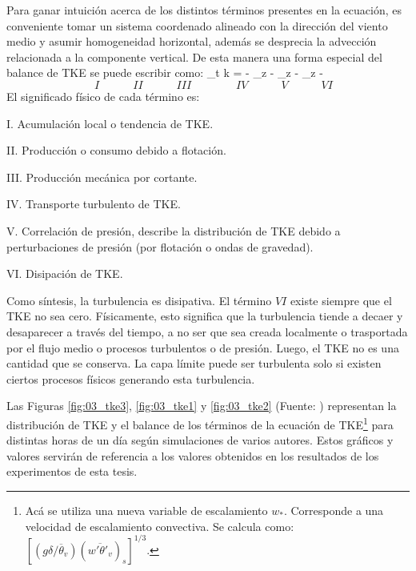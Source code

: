 Para ganar intuición acerca de los distintos términos presentes en la ecuación, es conveniente tomar un sistema coordenado alineado con la dirección del viento medio y asumir homogeneidad horizontal, además se desprecia la advección relacionada a la componente vertical. De esta manera una forma especial del balance de TKE se puede escribir como:
\newpage
\be
\partial_t k  =  -  \partial_z  - \partial_z -  \partial_z  - \varepsilon
\ee
\vspace{-7mm}
\begin{equation*}
\quad I \quad\qquad II\quad\qquad III\qquad\qquad IV\quad\qquad V\quad\qquad VI
\end{equation*}
El significado físico de cada término es:
\begin{enumerate*}
	\item[I.] Acumulación local o tendencia de TKE.
	\item[II.] Producción o consumo debido a flotación.
	\item[III.] Producción mecánica por cortante.
	\item[IV.] Transporte turbulento de TKE.
	\item[V.] Correlación de presión, describe la distribución de TKE debido a perturbaciones de presión (por flotación o ondas de gravedad).
	\item[VI.] Disipación de TKE.
\end{enumerate*}

Como síntesis, la turbulencia es disipativa. El término $VI$ existe siempre que el TKE no sea cero. Físicamente, esto significa que la turbulencia tiende a decaer y desaparecer a través del tiempo, a no ser que sea creada localmente o trasportada por el flujo medio o procesos turbulentos o de presión. Luego, el TKE no es una cantidad que se conserva. La capa límite puede ser turbulenta solo si existen ciertos procesos físicos generando esta turbulencia.

Las Figuras \ref{fig:03_tke3}, \ref{fig:03_tke1} y \ref{fig:03_tke2} (Fuente: \cite{stull1988introduction}) representan la distribución de TKE y el balance de los términos de la ecuación de TKE\footnote{Acá se utiliza una nueva variable de escalamiento $w_*$. Corresponde a una velocidad de escalamiento convectiva. Se calcula como: $[(g\delta/\overline{\theta}_v)(\overline{w'\theta'_v})_s]^{1/3}$.} para distintas horas de un día según simulaciones de varios autores. Estos gráficos y valores servirán de referencia a los valores obtenidos en los resultados de los experimentos de esta tesis.


